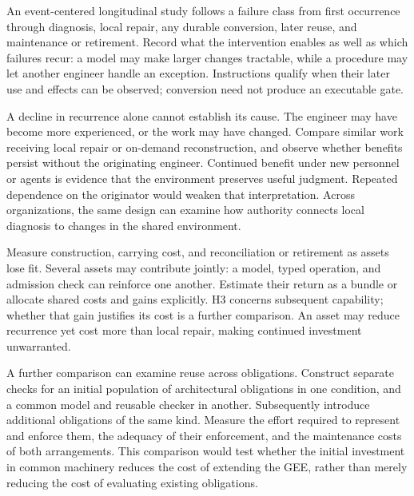 An event-centered longitudinal study follows a failure class from first occurrence through diagnosis, local repair, any durable conversion, later reuse, and maintenance or retirement. Record what the intervention enables as well as which failures recur: a model may make larger changes tractable, while a procedure may let another engineer handle an exception. Instructions qualify when their later use and effects can be observed; conversion need not produce an executable gate.

A decline in recurrence alone cannot establish its cause. The engineer may have become more experienced, or the work may have changed. Compare similar work receiving local repair or on-demand reconstruction, and observe whether benefits persist without the originating engineer. Continued benefit under new personnel or agents is evidence that the environment preserves useful judgment. Repeated dependence on the originator would weaken that interpretation. Across organizations, the same design can examine how authority connects local diagnosis to changes in the shared environment.


Measure construction, carrying cost, and reconciliation or retirement as assets lose fit. Several assets may contribute jointly: a model, typed operation, and admission check can reinforce one another. Estimate their return as a bundle or allocate shared costs and gains explicitly. H3 concerns subsequent capability; whether that gain justifies its cost is a further comparison. An asset may reduce recurrence yet cost more than local repair, making continued investment unwarranted.

A further comparison can examine reuse across obligations. Construct separate checks for an initial population of architectural obligations in one condition, and a common model and reusable checker in another. Subsequently introduce additional obligations of the same kind. Measure the effort required to represent and enforce them, the adequacy of their enforcement, and the maintenance costs of both arrangements. This comparison would test whether the initial investment in common machinery reduces the cost of extending the GEE, rather than merely reducing the cost of evaluating existing obligations.

